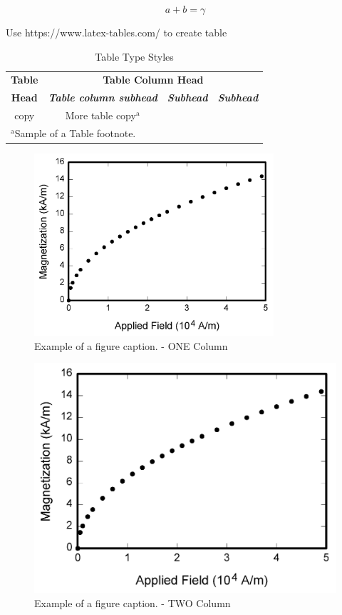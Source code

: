 \documentclass[conference]{IEEEtran}
\begin{document}
\begin{equation}
    a+b=\gamma\label{eq:name}
\end{equation}

Use https://www.latex-tables.com/ to create table

\begin{table}[htbp]
    \caption{Table Type Styles}
    \begin{center}
        \begin{tabular}{|c|c|c|c|}
            \hline
            \textbf{Table} & \multicolumn{3}{|c|}{\textbf{Table Column Head}}                                                         \\
            \cline{2-4}
            \textbf{Head}  & \textbf{\textit{Table column subhead}}           & \textbf{\textit{Subhead}} & \textbf{\textit{Subhead}} \\
            \hline
            copy           & More table copy$^{\mathrm{a}}$                   &                           &                           \\
            \hline
            \multicolumn{4}{l}{$^{\mathrm{a}}$Sample of a Table footnote.}
        \end{tabular}
        \label{tab1e:name}
    \end{center}
\end{table}

\begin{figure}[htbp]
    \includegraphics[width=3.5in]{Photos/fig1.png}
    \caption{Example of a figure caption. - ONE Column}
    \label{fig:name1}
\end{figure}

\begin{figure}[htbp]
    \includegraphics[width=7.16in]{Photos/fig1.png}
    \caption{Example of a figure caption. - TWO Column}
    \label{fig:name2}
\end{figure}



\end{document}
